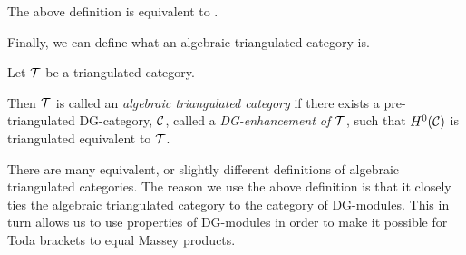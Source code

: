The above definition is equivalent to \cite[Definition 3.1.1]{Jasso-Muro_2023}.

Finally, we can define what an algebraic triangulated category is.
\begin{definition}
    \label{def:alg_tri_cat}
    Let \( {\mathcal{T}} \) be a triangulated category.

    Then \( {\mathcal{T}} \) is called an \emph{algebraic triangulated category} if there exists a pre-triangulated DG-category, \( {\mathcal{C}} \), called a \emph{DG-enhancement of \( {\mathcal{T}} \)}, such that \( H^0({\mathcal{C}}) \) is triangulated equivalent to \( {\mathcal{T}} \).
\end{definition}

There are many equivalent, or slightly different definitions of algebraic triangulated categories. The reason we use the above definition is that it closely ties the algebraic triangulated category to the category of DG-modules. This in turn allows us to use properties of DG-modules in order to make it possible for Toda brackets to equal Massey products.
